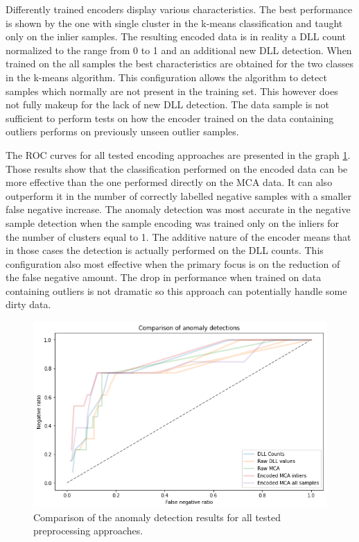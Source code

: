 \documentclass[a4paper,twoside,12pt]{book}
\begin{document}
Differently trained encoders display various characteristics. The best performance is shown by
the one with single cluster in the k-means classification and taught only on the inlier samples.
The resulting encoded data is in reality a DLL count normalized to the range from 0 to 1 and an
additional new DLL detection. When trained on the all samples the best characteristics are 
obtained for the two classes in the k-means algorithm. This configuration allows the algorithm
to detect samples which normally are not present in the training set. This however does not 
fully makeup for the lack of new DLL detection. The data sample is not sufficient to perform
tests on how the encoder trained on the data containing outliers performs on previously unseen
outlier samples.

The ROC curves for all tested encoding approaches are presented in the graph \ref{fig:GraphComp}.
Those results show that the classification performed on the encoded data can be more effective
than the one performed directly on the MCA data. It can also outperform it in the number of 
correctly labelled negative samples with a smaller false negative increase. The anomaly 
detection was most accurate in the negative sample detection when the sample encoding was trained only on the inliers
for the number of clusters equal to 1. The additive nature of the encoder means that in those cases the 
detection is actually performed on the DLL counts. This configuration also most effective 
when the primary focus is on the reduction of the false negative amount. The drop in performance when 
trained on data containing outliers is not dramatic so this approach can potentially handle some 
dirty data.

\begin{figure}
	\centering
	\includegraphics[scale=0.9]{images/DLLCompGraphKF.PNG}
	\caption{Comparison of the anomaly detection results for all tested preprocessing approaches.}
	\label{fig:GraphComp}
 \end{figure}
\end{document}
